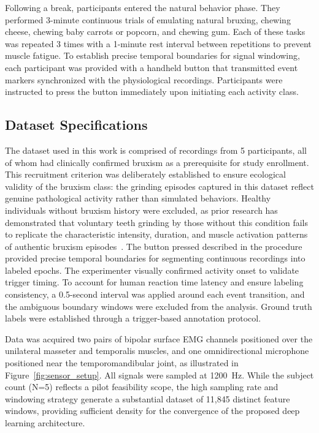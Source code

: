\documentclass[pdflatex,sn-vancouver-num, iicol]{sn-jnl}
\begin{document}
Following a break, participants entered the natural behavior phase. They performed 3-minute continuous trials of emulating natural bruxing, chewing cheese, chewing baby carrots or popcorn, and chewing gum. Each of these tasks was repeated 3 times with a 1-minute rest interval between repetitions to prevent muscle fatigue. To establish precise temporal boundaries for signal windowing, each participant was provided with a handheld button that transmitted event markers synchronized with the physiological recordings. Participants were instructed to press the button immediately upon initiating each activity class.



\subsection{Dataset Specifications}

The dataset used in this work is comprised of recordings from 5 participants, all of whom had clinically confirmed bruxism as a prerequisite for study enrollment. This recruitment criterion was deliberately established to ensure ecological validity of the bruxism class: the grinding episodes captured in this dataset reflect genuine pathological activity rather than simulated behaviors. Healthy individuals without bruxism history were excluded, as prior research has demonstrated that voluntary teeth grinding by those without this condition fails to replicate the characteristic intensity, duration, and muscle activation patterns of authentic bruxism episodes~\cite{lavigne2008bruxism}.  The button pressed described in the procedure provided precise temporal boundaries for segmenting continuous recordings into labeled epochs. The experimenter visually confirmed activity onset to validate trigger timing. To account for human reaction time latency and ensure labeling consistency, a 0.5-second interval was applied around each event transition, and the ambiguous boundary windows were excluded from the analysis. Ground truth labels were established through a trigger-based annotation protocol.

Data was acquired two pairs of bipolar surface EMG channels positioned over the unilateral masseter and temporalis muscles, and one omnidirectional microphone positioned near the temporomandibular joint, as illustrated in Figure~\ref{fig:sensor_setup}. All signals were sampled at 1200~Hz. While the subject count (N=5) reflects a pilot feasibility scope, the high sampling rate and windowing strategy generate a substantial dataset of 11,845 distinct feature windows, providing sufficient density for the convergence of the proposed deep learning architecture.
\end{document}

